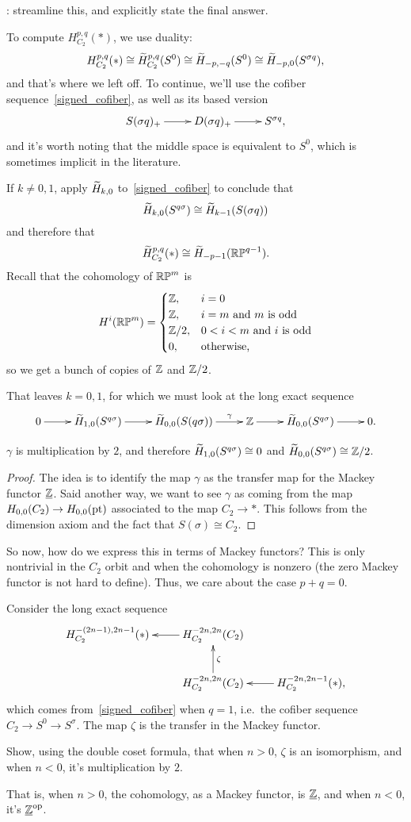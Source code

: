 \TODO: streamline this, and explicitly state the final answer.

To compute $H_{C_2}^{p,q}(*)$, we use duality:
\[H_{C_2}^{p,q}(*) \cong \widetilde H^{p,q}_{C_2}(S^0)\cong \widetilde H_{-p,-q}(S^0)\cong \widetilde H_{-p,0}(S^{\sigma q}),\]
and that's where we left off. To continue, we'll use the cofiber sequence~\eqref{signed_cofiber}, as well as its
based version
\begin{equation}
\label{based_signed}
\xymatrix{
	S(\sigma q)_+\ar[r] & D(\sigma q)_+\ar[r] & S^{\sigma q},
}
\end{equation}
and it's worth noting that the middle space is equivalent to $S^0$, which is sometimes implicit in the literature.

If $k\ne 0,1$, apply $\widetilde H_{k,0}$ to~\eqref{signed_cofiber} to conclude that
\[\widetilde H_{k,0}(S^{q\sigma})\cong \widetilde H_{k-1}(S(\sigma q))\]
and therefore that
\[\widetilde H_{C_2}^{p,q}(*)\cong \widetilde H_{-p-1}(\mathbb{RP}^{q-1}).\]
Recall that the cohomology of $\mathbb{RP}^m$ is
\[H^i(\mathbb{RP}^m) = \begin{cases}
	\mathbb Z, &i = 0\\
	\mathbb Z, &i = m\text{ and $m$ is odd}\\
	\mathbb Z/2, &0 < i < m\text{ and $i$ is odd}\\
	0, &\text{otherwise,}
\end{cases}\]
so we get a bunch of copies of $\mathbb Z$ and $\mathbb Z/2$.

That leaves $k = 0,1$, for which we must look at the long exact sequence
\[\xymatrix{
	0\ar[r] & \wH_{1,0}(S^{q\sigma})\ar[r] & \wH_{0,0}(S(q\sigma))\ar[r]^-\gamma &\Z\ar[r] &
	\wH_{0,0}(S^{q\sigma})\ar[r] & 0.
}\]
\begin{claim}
$\gamma$ is multiplication by $2$, and therefore $\widetilde H_{1,0}(S^{q\sigma})\cong 0$ and
$\widetilde H_{0,0}(S^{q\sigma})\cong\mathbb Z/2$.
\end{claim}
\begin{proof}
The idea is to identify the map $\gamma$ as the transfer map for the Mackey functor
$\underline{\mathbb Z}$. Said another way, we want to see $\gamma$ as coming from the map $H_{0,0}(C_2)\to H_{0,0}(\mathrm{pt})$
associated to the map $C_2\to *$. This follows from the dimension axiom and the fact that $S(\sigma)\cong C_2$.
\end{proof}
So now, how do we express this in terms of Mackey functors? This is only nontrivial in the $C_2$ orbit and when the
cohomology is nonzero (the zero Mackey functor is not hard to define). Thus, we care about the case $p+q = 0$.

Consider the long exact sequence
\[\xymatrix{
	H_{C_2}^{-(2n-1), 2n-1}(*) & H_{C_2}^{-2n,2n}(C_2)\ar[l]\\
	& H_{C_2}^{-2n,2n}(C_2)\ar[u]_\zeta & H_{C_2}^{-2n,2n-1}(*),\ar[l]
}\]
which comes from~\eqref{signed_cofiber} when $q = 1$, i.e.\ the cofiber sequence $C_2\to S^0\to S^\sigma$. The map
$\zeta$ is the transfer in the Mackey functor.
\begin{ex}
Show, using the double coset formula, that when $n > 0$, $\zeta$ is an isomorphism, and when $n < 0$, it's
multiplication by $2$.
\end{ex}
That is, when $n > 0$, the cohomology, as a Mackey functor, is $\underline{\mathbb Z}$, and when $n < 0$, it's
$\underline{\mathbb Z}^{\mathrm{op}}$.
